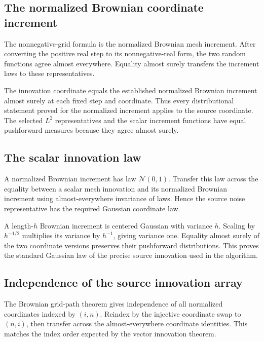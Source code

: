 \documentclass[11pt,a4paper]{article}
\begin{document}
\subsection{\texorpdfstring{The normalized Brownian coordinate increment}{The normalized Brownian coordinate increment}}


The nonnegative-grid formula is the normalized Brownian mesh increment. After converting the positive real step to its nonnegative-real form, the two random functions agree almost everywhere. Equality almost surely transfers the increment laws to these representatives.



The innovation coordinate equals the established normalized Brownian increment almost surely at each fixed step and coordinate. Thus every distributional statement proved for the normalized increment applies to the source coordinate. The selected \(L^2\) representatives and the scalar increment functions have equal pushforward measures because they agree almost surely.


\subsection{\texorpdfstring{The scalar innovation law}{The scalar innovation law}}


A normalized Brownian increment has law \(\mathcal N(0,1)\). Transfer this law across the equality between a scalar mesh innovation and its normalized Brownian increment using almost-everywhere invariance of laws. Hence the source noise representative has the required Gaussian coordinate law.



A length-\(h\) Brownian increment is centered Gaussian with variance \(h\). Scaling by \(h^{-1/2}\) multiplies its variance by \(h^{-1}\), giving variance one. Equality almost surely of the two coordinate versions preserves their pushforward distributions. This proves the standard Gaussian law of the precise source innovation used in the algorithm.


\subsection{\texorpdfstring{Independence of the source innovation array}{Independence of the source innovation array}}


The Brownian grid-path theorem gives independence of all normalized coordinates indexed by \((i,n)\). Reindex by the injective coordinate swap to \((n,i)\), then transfer across the almost-everywhere coordinate identities. This matches the index order expected by the vector innovation theorem.
\end{document}
